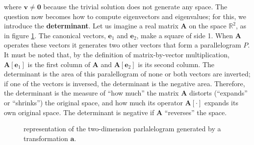 	\noindent where $\mathbf{v}\neq \mathbf{0}$ because the trivial solution does not generate any space. The question now becomes how to compute eigenvectors and eigenvalues; for this, we introduce the \textbf{determinant}. Let us imagine a real matrix $\mathbf{A}$ on the space $\mathbb{R}^2$, as in figure \ref{fig:determinant}. The canonical vectors, $\mathbf{e}_1$ and $\mathbf{e}_2$, make a square of side 1. When $\mathbf{A}$ operates these vectors it generates two other vectors that form a parallelogram $P$. It must be noted that, by the definition of matrix-by-vector multiplication, $\mathbf{A}\left[\mathbf{e}_1\right]$ is the first column of $\mathbf{A}$ and $\mathbf{A}\left[\mathbf{e}_2\right]$ is its second column. The determinant is the area of this paralellogram of none or both vectors are inverted; if one of the vectors is inversed, the determinant is the negative area. Therefore, the determinant is the measure of ``how much'' the matrix $\mathbf{A}$ distorts (``expands'' or ``shrinks'') the original space, and how much its operator $\mathbf{A}\left[\cdot\right]$ expands its own original space. The determinant is negative if $\mathbf{A}$ ``reverses'' the space.

\begin{figure}[htb!]
\centering
{}
	\caption{representation of the two-dimension parlalelogram generated by a transformation $\mathbf{a}$.}
	\label{fig:determinant}
\end{figure} %

